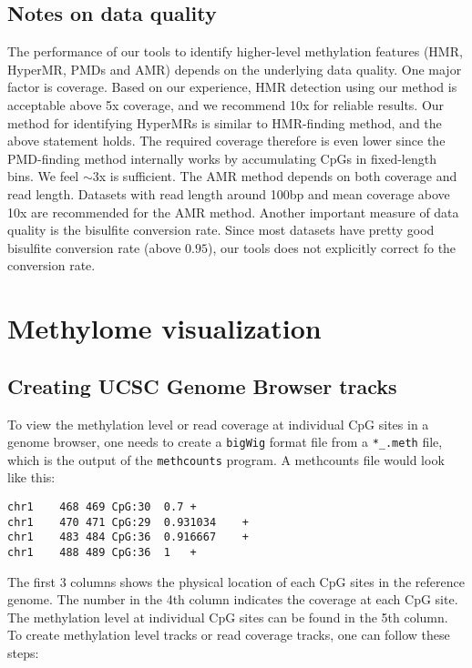 \documentclass[10pt]{article}
\newcommand{\prog}[1]{\texttt{#1}}
\newcommand{\fn}[1]{\texttt{#1}}
\newcommand{\lit}[1]{\texttt{#1}}
\begin{document}
\subsection{Notes on data quality}
\label{sec:notes-data-quality}
The performance of our tools to identify higher-level methylation
features (HMR, HyperMR, PMDs and AMR) depends on the underlying data
quality. One major factor is coverage. Based on our experience, HMR
detection using our method is acceptable above 5x coverage, and we
recommend 10x for reliable results. Our method for identifying
HyperMRs is similar to HMR-finding method, and the above statement
holds. The required coverage therefore is even lower since the
PMD-finding method internally works by accumulating CpGs in
fixed-length bins. We feel $\sim$3x is sufficient. The AMR method
depends on both coverage and read length. Datasets with read length
around 100bp and mean coverage above 10x are recommended for the AMR
method. Another important measure of data quality is the bisulfite
conversion rate. Since most datasets have pretty good bisulfite
conversion rate (above $0.95$), our tools does not explicitly correct
fo the conversion rate.

\section{Methylome visualization}
\label{sec:visualization}


\subsection{Creating UCSC Genome Browser tracks}
\label{sec:browser}

To view the methylation level or read coverage at individual CpG sites
in a genome browser, one needs to create a \lit{bigWig} format file
from a \fn{*\_.meth} file, which is the output of the \prog{methcounts}
program. A methcounts file would look like this:

\begin{verbatim}
chr1	468	469	CpG:30	0.7	+
chr1	470	471	CpG:29	0.931034	+
chr1	483	484	CpG:36	0.916667	+
chr1	488	489	CpG:36	1	+
\end{verbatim}

The first 3 columns shows the physical location of each CpG sites in
the reference genome. The number in the 4th column indicates the
coverage at each CpG site. The methylation level at individual CpG
sites can be found in the 5th column. To create methylation level
tracks or read coverage tracks, one can follow these steps:
\end{document}
